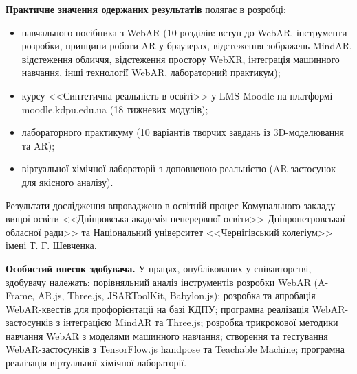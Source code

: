 \textbf{Практичне значення одержаних результатів} полягає в розробці:
\begin{itemize}
    \item навчального посібника з WebAR (10 розділів: вступ до WebAR, інструменти розробки, принципи роботи AR у браузерах, відстеження зображень MindAR, відстеження обличчя, відстеження простору WebXR, інтеграція машинного навчання, інші технології WebAR, лабораторний практикум);
    \item курсу <<Синтетична реальність в освіті>> у LMS Moodle на платформі moodle.kdpu.edu.ua (18 тижневих модулів);
    \item лабораторного практикуму (10 варіантів творчих завдань із 3D-моделювання та AR);
    \item віртуальної хімічної лабораторії з доповненою реальністю (AR-застосунок для якісного аналізу).
\end{itemize}

Результати дослідження впроваджено в освітній процес Комунального закладу вищої освіти <<Дніпровська академія неперервної освіти>> Дніпропетровської обласної ради>> та Національний університет <<Чернігівський колегіум>> імені Т. Г. Шевченка.


\textbf{Особистий внесок здобувача.} У працях, опублікованих у співавторстві, здобувачу належать: порівняльний аналіз інструментів розробки WebAR (A-Frame, AR.js, Three.js, JSARToolKit, Babylon.js); розробка та апробація WebAR-квестів для профорієнтації на базі КДПУ; програмна реалізація WebAR-застосунків з інтеграцією MindAR та Three.js; розробка трикрокової методики навчання WebAR з моделями машинного навчання; створення та тестування WebAR-застосунків з TensorFlow.js handpose та Teachable Machine; програмна реалізація віртуальної хімічної лабораторії.

